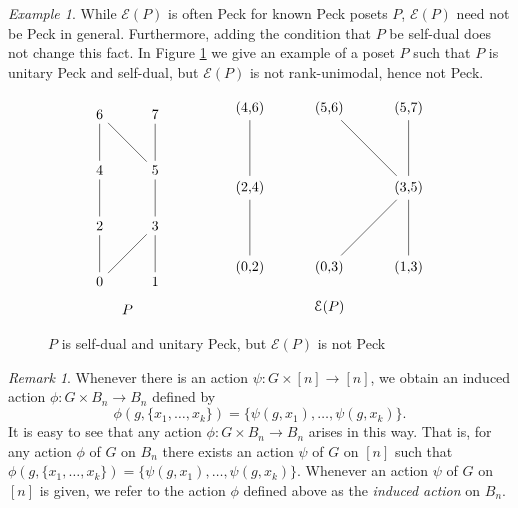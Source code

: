 \documentclass[smallextended, envcountsame, numbook]{svjour3}
\theoremstyle{plain}
\theoremstyle{definition}
\theoremstyle{remark}
\newtheorem{rmk}[thm]{Remark}
\newtheorem{eg}[thm]{Example}
\numberwithin{equation}{section}
\begin{document}
\begin{eg}
While $\mathcal{E}(P)$ is often Peck for known Peck posets $P$, $\mathcal E(P)$ need not be Peck in general.  Furthermore, adding the condition that $P$ be self-dual does not change this fact.  In Figure \ref{fig:dual_not_unimodal} we give an example of a poset $P$ such that $P$ is unitary Peck and self-dual, but $\mathcal{E}(P)$ is not rank-unimodal, hence not Peck.
\end{eg}

\begin{figure}[h]
\[
\begin{tikzpicture}[scale = .7]
  \node (0) at (0,0) {0};
  \node (1) at (2,0) {1};
  \node (2) at (0,2) {2};
  \node (3) at (2,2) {3};
  \node (4) at (0,4) {4};
  \node (5) at (2,4) {5};
  \node (6) at (0,6) {6};
  \node (7) at (2,6) {7};
  \draw (0)--(2);
  \draw (0)--(3);
  \draw (1)--(3);
  \draw (2)--(4);
  \draw (3)--(5);
  \draw (4)--(6);
  \draw (5)--(6);
  \draw (5)--(7);
  \node (8) at (1,-1) {$P$};
\end{tikzpicture}\qquad \hspace{10mm}
\begin{tikzpicture}
  \node (02) at (0,0) {(0,2)};
  \node (03) at (2,0) {(0,3)};
  \node (13) at (4,0) {(1,3)};
  \node (24) at (0,2) {(2,4)};
  \node (35) at (4,2) {(3,5)};
  \node (46) at (0,4) {(4,6)};
  \node (56) at (2,4) {(5,6)};
  \node (57) at (4,4) {(5,7)};
  \draw (02)--(24);
  \draw (03)--(35);
  \draw (13)--(35);
  \draw (24)--(46);
  \draw (35)--(56);
  \draw (35)--(57);
  \node (0) at (2,-1) {$\mathcal{E}(P)$};
\end{tikzpicture}\]
\caption{\label{fig:dual_not_unimodal}$P$ is self-dual and unitary Peck, but $\mathcal{E}(P)$ is not Peck}
\end{figure}


\begin{rmk}
\label{rem:induced_action_bn}
Whenever there is an action $\psi\colon G \times [n] \rightarrow [n]$, we obtain an induced action $\phi: G \times B_n \rightarrow B_n$ defined by
$$\phi(g,\{x_1,\ldots, x_k\}) = \{\psi(g,x_1),\ldots, \psi(g,x_k)\}.$$
It is easy to see that any action $\phi\colon G \times B_n \rightarrow B_n$ arises in this way. That is, for any action $\phi$ of $G$ on $B_n$ there exists an action $\psi$ of $G$ on $[n]$ such that $\phi(g,\{x_1,\ldots, x_k\}) = \{\psi(g,x_1),\ldots, \psi(g,x_k)\}$. Whenever an action $\psi$ of $G$ on $[n]$ is given, we refer to the action $\phi$ defined above as the {\it induced action} on $B_n$.
\end{rmk}
\end{document}
